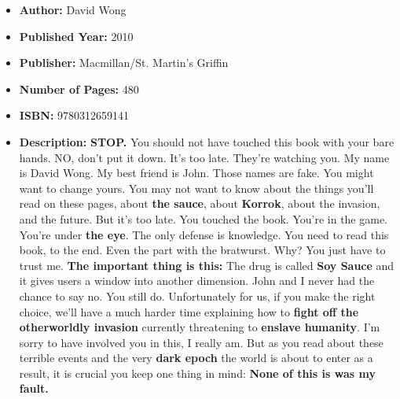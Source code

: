 \documentclass{tufte-handout}
\begin{document}
\begin{itemize}
    \item[] \textbf{Author:} David Wong
    \item[] \textbf{Published Year:} 2010
    \item[] \textbf{Publisher:} Macmillan/St. Martin's Griffin
    \item[] \textbf{Number of Pages:} 480
    \item[] \textbf{ISBN:} 9780312659141
    \item[] \textbf{Description:} \textbf{STOP.} You should not have touched this book with your bare hands. NO, don't put it down. It's too late. They're watching you. My name is David Wong. My best friend is John. Those names are fake. You might want to change yours. You may not want to know about the things you'll read on these pages, about \textbf{the sauce}, about \textbf{Korrok}, about the invasion, and the future. But it's too late. You touched the book. You're in the game. You're under \textbf{the eye}. The only defense is knowledge. You need to read this book, to the end. Even the part with the bratwurst. Why? You just have to trust me. \textbf{The important thing is this:} The drug is called \textbf{Soy Sauce} and it gives users a window into another dimension. John and I never had the chance to say no. You still do. Unfortunately for us, if you make the right choice, we'll have a much harder time explaining how to \textbf{fight off the otherworldly invasion} currently threatening to \textbf{enslave humanity}. I'm sorry to have involved you in this, I really am. But as you read about these terrible events and the very \textbf{dark epoch} the world is about to enter as a result, it is crucial you keep one thing in mind: \textbf{None of this is was my fault.}
\end{itemize}
\end{document}
